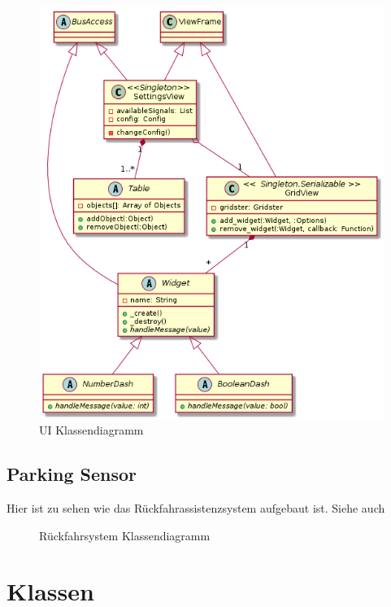 \documentclass[entwurf.tex]{subfiles}
\begin{document}
		
		\begin{figure}[H]
  			\begin{center}
 				\includegraphics[width=\textwidth]{diagrams/UI.png}
  				\caption{UI Klassendiagramm}
  			\end{center}
  		\end{figure}
  		
  		
  		
  	\newpage
  	\section{Parking Sensor}
		Hier ist zu sehen wie das Rückfahrassistenzsystem aufgebaut ist. Siehe auch %
		\begin{figure}[H]
  			\caption{Rückfahrsystem Klassendiagramm}
  		\end{figure}
  	
  	
\chapter{Klassen}
\end{document}

